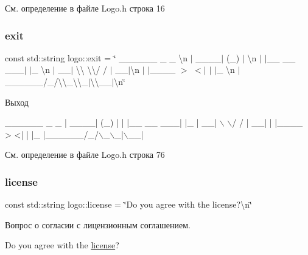 См. определение в файле Logo.\+h строка 16

\mbox{\label{namespacelogo_aba8ca66bcf8abe6a0991a13887671863}} 
\subsubsection{\texorpdfstring{exit}{exit}}
{\footnotesize\ttfamily const std\+::string logo\+::exit = \char`\"{} \+\_\+\+\_\+\+\_\+\+\_\+\+\_\+\+\_\+ \+\_\+ \+\_\+ \textbackslash{}n $\vert$ \+\_\+\+\_\+\+\_\+\+\_\+$\vert$ (\+\_\+) $\vert$ \textbackslash{}n $\vert$ $\vert$\+\_\+\+\_\+ \+\_\+\+\_\+ \+\_\+\+\_\+\+\_\+$\vert$ $\vert$\+\_\+ \textbackslash{}n $\vert$ \+\_\+\+\_\+$\vert$ \textbackslash{}\textbackslash{} \textbackslash{}\textbackslash{}/ / $\vert$ \+\_\+\+\_\+$\vert$\textbackslash{}n $\vert$ $\vert$\+\_\+\+\_\+\+\_\+\+\_\+ $>$ $<$$\vert$ $\vert$ $\vert$\+\_\+ \textbackslash{}n $\vert$\+\_\+\+\_\+\+\_\+\+\_\+\+\_\+\+\_\+/\+\_\+/\textbackslash{}\textbackslash{}\+\_\+\textbackslash{}\textbackslash{}\+\_\+$\vert$\textbackslash{}\textbackslash{}\+\_\+\+\_\+$\vert$\textbackslash{}n\char`\"{}}

Выход 
\begin{DoxyCode}
 \_\_\_\_\_\_      \_ \_   
|  \_\_\_\_|    (\_) |  
| |\_\_  \_\_  \_\_\_| |\_ 
|  \_\_| \(\backslash\) \(\backslash\)/ / | \_\_|
| |\_\_\_\_ >  <| | |\_ 
|\_\_\_\_\_\_/\_/\(\backslash\)\_\(\backslash\)\_|\(\backslash\)\_\_|
\end{DoxyCode}
 

См. определение в файле Logo.\+h строка 76

\mbox{\label{namespacelogo_ae5491adc000fde7d3d8229372c877da2}} 
\subsubsection{\texorpdfstring{license}{license}}
{\footnotesize\ttfamily const std\+::string logo\+::license = \char`\"{}Do you agree with the license?\textbackslash{}n\char`\"{}}

Вопрос о согласии с лицензионным соглашением. 
\begin{DoxyCode}
Do you agree with the \hyperlink{namespacelogo_ae5491adc000fde7d3d8229372c877da2}{license}?
\end{DoxyCode}
 

